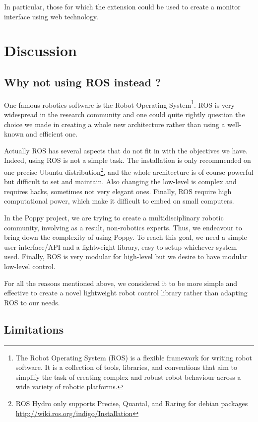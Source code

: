 In particular, those for which the extension could be used to create a monitor interface using web technology.



\section{Discussion} %

\subsection{Why not using ROS instead ?} %

One famous robotics software is the Robot Operating System\footnote{The Robot Operating System (ROS) is a flexible framework for writing robot software. It is a collection of tools, libraries, and conventions that aim to simplify the task of creating complex and robust robot behaviour across a wide variety of robotic platforms.}. ROS is very widespread in the research community and one could quite rightly question the choice we made in creating a whole new architecture rather than using a well-known and efficient one.

Actually ROS has several aspects that do not fit in with the objectives we have. Indeed, using ROS is not a simple task. The installation is only recommended on one precise Ubuntu distribution\footnote{ROS Hydro only supports Precise, Quantal, and Raring for debian packages \url{http://wiki.ros.org/indigo/Installation}}, and the whole architecture is of course powerful but difficult to set and maintain. Also changing the low-level is complex and requires hacks, sometimes not very elegant ones. Finally, ROS require high computational power, which make it difficult to embed on small computers.

In the Poppy project, we are trying to create a multidisciplinary robotic community, involving as a result, non-robotics experts. Thus, we endeavour to bring down the complexity of using Poppy. To reach this goal, we need a simple user interface/API and a lightweight library, easy to setup whichever system used. Finally, ROS is very modular for high-level but we desire to have modular low-level control.

For all the reasons mentioned above, we considered it to be more simple and effective to create a novel lightweight robot control library rather than adapting ROS to our needs.


\subsection{Limitations} %

